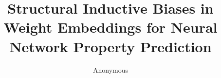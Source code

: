 \documentclass[10pt]{article}
\title{Structural Inductive Biases in Weight Embeddings for Neural Network Property Prediction}
\author{Anonymous}
\date{}
\begin{document}
\maketitle

\begin{abstract}

\end{abstract}











\end{document}

